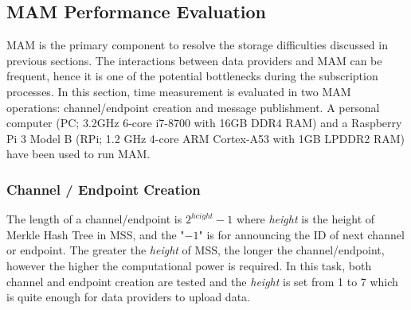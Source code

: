 \documentclass[10pt, conference, compsocconf]{IEEEtran}
\begin{document}
\subsection{MAM Performance Evaluation}
\label{section:mam_performance}
MAM is the primary component to resolve the storage difficulties discussed in previous sections. The interactions between data providers and MAM can be frequent, hence it is one of the potential bottlenecks during the subscription processes. In this section, time measurement is evaluated in two MAM operations: channel/endpoint creation and message publishment. A personal computer (PC; 3.2GHz 6-core i7-8700 with 16GB DDR4 RAM) and a Raspberry Pi 3 Model B (RPi; 1.2 GHz 4-core ARM Cortex-A53 with 1GB LPDDR2 RAM) have been used to run MAM.

\subsubsection{Channel / Endpoint Creation}
The length of a channel/endpoint is $2^{height}-1$ where \textit{height} is the height of Merkle Hash Tree in MSS, and the "$-1$" is for announcing the ID of next channel or endpoint. The greater the \textit{height} of MSS, the longer the channel/endpoint, however the higher the computational power is required. In this task, both channel and endpoint creation are tested and the \textit{height} is set from 1 to 7 which is quite enough for data providers to upload data.
\end{document}
